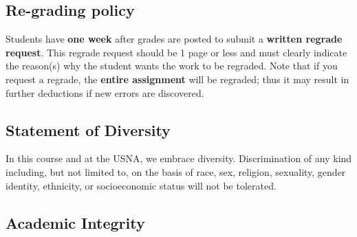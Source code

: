 \documentclass[letterpaper,hidelinks,oneside,11pt]{article}%
\begin{document}
\subsection*{Re-grading policy}
Students have \textbf{one week} after grades are posted to submit a \textbf{written regrade request}. This regrade request should be 1 page or less and must clearly indicate the reason(s) why the student wants the work to be regraded. Note that if you request a regrade, the \textbf{entire assignment} will be regraded; thus it may result in further deductions if new errors are discovered.
 



\subsection*{Statement of Diversity}

In this course and at the USNA, we embrace diversity. Discrimination of any kind including, but not limited to, on the basis of race, sex, religion, sexuality, gender identity, ethnicity, or socioeconomic status will not be tolerated.


\subsection*{Academic Integrity}
\end{document}
